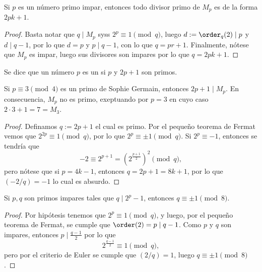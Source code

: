 \documentclass[teoria-numeros.tex]{subfiles}
\begin{document}
\begin{prop}
	Si $p$ es un número primo impar, entonces todo divisor primo de $M_p$ es de la forma $2pk + 1$.
\end{prop}
\begin{proof}
	Basta notar que $q \mid M_p$ syss $2^p \equiv 1 \pmod q$, luego $d := \order_q(2) \mid p$ y $d \mid q - 1$,
	por lo que $d = p$ y $p \mid q - 1$, con lo que $q = pr + 1$.
	Finalmente, nótese que $M_p$ es impar, luego sus divisores son impares por lo que $q = 2pk + 1$.
\end{proof}

\begin{mydef}
	Se dice que un número $p$ es un  si $p$ y $2p + 1$ son primos.
\end{mydef}


\begin{thm}
	Si $p \equiv 3 \pmod 4$ es un primo de Sophie Germain, entonces $2p + 1 \mid M_p$.
	En consecuencia, $M_p$ no es primo, exeptuando por $p = 3$ en cuyo caso $2\cdot 3 + 1 = 7 = M_3$.
\end{thm}
\begin{proof}
	Definamos $q := 2p + 1$ el cual es primo.
	Por el pequeño teorema de Fermat vemos que $2^{2p} \equiv 1 \pmod q$, por lo que $2^p \equiv \pm 1 \pmod q$.
	Si $2^p \equiv -1$, entonces se tendría que
	$$ -2 \equiv 2^{p+1} = \left( 2^{\frac{p+1}{2}} \right)^2 \pmod q, $$
	pero nótese que si $p = 4k - 1$, entonces $q = 2p + 1 = 8k + 1$, por lo que $(-2/q) = -1$ lo cual es absurdo.
\end{proof}

\begin{prop}
	Si $p, q$ son primos impares tales que $q \mid 2^p - 1$, entonces $q \equiv \pm 1 \pmod 8$.
\end{prop}
\begin{proof}
	Por hipótesis tenemos que $2^p \equiv 1 \pmod q$, y luego, por el pequeño teorema de Fermat, se cumple que $\order(2) = p \mid q - 1$.
	Como $p$ y $q$ son impares, entonces $p \mid \frac{q - 1}{2}$ por lo que
	$$ 2^{ \frac{q-1}{2} } \equiv 1 \pmod q, $$
	pero por el criterio de Euler se cumple que $(2/q) = 1$, luego $q \equiv \pm 1 \pmod 8$.
\end{proof}
\end{document}
